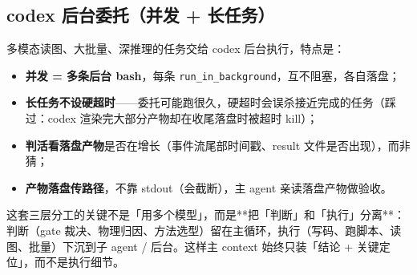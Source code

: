 \subsection{codex 后台委托（并发 + 长任务）}

多模态读图、大批量、深推理的任务交给 codex 后台执行，特点是：

\begin{itemize}
  \item \textbf{并发 = 多条后台 bash}，每条 \texttt{run\_in\_background}，互不阻塞，各自落盘；
  \item \textbf{长任务不设硬超时}——委托可能跑很久，硬超时会误杀接近完成的任务（踩过：codex 渲染完大部分产物却在收尾落盘时被超时 kill）；
  \item \textbf{判活看落盘产物}是否在增长（事件流尾部时间戳、result 文件是否出现），而非猜；
  \item \textbf{产物落盘传路径}，不靠 stdout（会截断），主 agent 亲读落盘产物做验收。
\end{itemize}

\begin{important}
这套三层分工的关键不是「用多个模型」，而是**把「判断」和「执行」分离**：判断（gate 裁决、物理归因、方法选型）留在主循环，执行（写码、跑脚本、读图、批量）下沉到子 agent / 后台。这样主 context 始终只装「结论 + 关键定位」，而不是执行细节。
\end{important}
